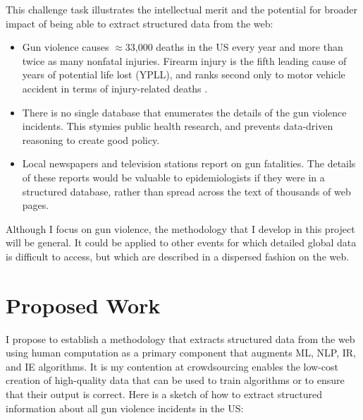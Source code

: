 \documentclass[11pt]{article}
\begin{document}
This challenge task illustrates the intellectual merit and the potential for broader impact of being able to extract structured data from the web:
\begin{itemize}
\item Gun violence causes $\approx$33,000 deaths in the US every year and more than twice as many nonfatal injuries. Firearm injury is the fifth leading cause of years of potential life lost (YPLL), and ranks second only to motor vehicle accident in terms of injury-related deaths  \cite{ficapresourcebook}. 
\item There is no single database that enumerates the details of the gun violence incidents.  This stymies public health research, and prevents data-driven reasoning to create good policy. 
\item Local newspapers and television stations report on gun fatalities. The details of these reports would be valuable to epidemiologists if they were in a structured database, rather than spread across the text of thousands of web pages.
\end{itemize}
Although I focus on gun violence, the methodology that I develop in this project will be general.  It could be applied to other events for which detailed global data is difficult to access, but which are described in a dispersed fashion on the web.  



\section{Proposed Work}

I propose to establish a methodology that extracts structured data from the web using human computation as a primary component that augments ML, NLP, IR, and IE algorithms.  It is my contention at crowdsourcing enables the low-cost creation of high-quality data that can be used to train algorithms or to ensure that their output is correct.   Here is a sketch of how to extract structured information about all gun violence incidents in the US:
\end{document}
